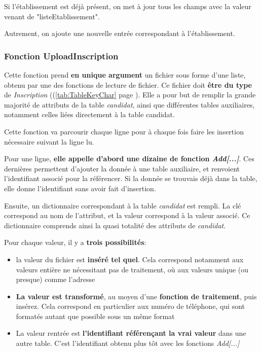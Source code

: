 Si l'établissement est déjà présent, on met à jour tous les champs avec la valeur venant de "listeEtablissement".

Autrement, on ajoute une nouvelle entrée correspondant à l'établissement.


\subsubsection{Fonction UploadInscription}


Cette fonction prend \textbf{en unique argument} un fichier sous forme d'une liste, obtenu par une des fonctions de lecture de fichier.
Ce fichier doit \textbf{être du type} de \textit{Inscription} ((\ref{tab:TableKeyChar} page \pageref{tab:TableKeyChar}).
Elle a pour but de remplir la grande majorité de attributs de la table \textit{candidat}, ainsi que différentes tables auxiliaires, notamment celles liées directement à la table candidat.


Cette fonction va parcourir chaque ligne pour à chaque fois faire les insertion nécessaire suivant la ligne lu.

Pour une ligne, \textbf{elle appelle d'abord une dizaine de fonction \textit{Add[...]}}.
Ces dernières permettent d'ajouter la donnée à une table auxiliaire, et renvoient l'identifiant associé pour la référencer.
Si la donnée se trouvais déjà dans la table, elle donne l'identifiant sans avoir fait d'insertion.


Ensuite, un dictionnaire correspondant à la table \textit{candidat} est rempli. La clé correspond au nom de l'attribut, et la valeur correspond à la valeur associé.
Ce dictionnaire comprends ainsi la quasi totalité des attributs de \textit{candidat}.


Pour chaque valeur, il y a \textbf{trois possibilités}:
\begin{itemize}
    \item la valeur du fichier est \textbf{inséré tel quel}. Cela correspond notamment aux valeurs entière ne nécessitant pas de traitement, où aux valeurs unique (ou presque) comme l'adresse
    \item \textbf{La valeur est transformé}, au moyen d'une \textbf{fonction de traitement}, puis insérez. Cela correspond en particulier aux numéro de téléphone, qui sont formatés autant que possible sous un même format
	\item La valeur rentrée est \textbf{l'identifiant référençant la vrai valeur} dans une autre table. C'est l'identifiant obtenu plus tôt avec les fonctions \textit{Add[...]}
\end{itemize}


